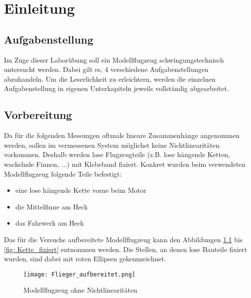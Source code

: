 \chapter{Einleitung}
\label{sec: Einleitung}

\section{Aufgabenstellung}
    Im Zuge dieser Laborübung soll ein Modellflugzeug schwingungstechnisch
    untersucht werden. Dabei gilt es, 4 verschiedene Aufgabenstellungen
    abzuhandeln. Um die Leserlichkeit zu erleichtern, werden die einzelnen
    Aufgabenstellung in eigenen Unterkapiteln jeweils vollständig abgearbeitet.

\section{Vorbereitung}
    Da für die folgenden Messungen oftmals lineare Zusammenhänge angenommen
    werden, sollen im vermessenen System möglichst keine Nichtlinearitäten
    vorkommen. Deshalb werden lose Flugzeugteile (z.B. lose hängende Ketten,
    wackelnde Finnen, ...) mit Klebeband fixiert.
    Konkret wurden beim verwendeten Modellflugzeug folgende Teile befestigt:

    \begin{itemize}
        \item eine lose hängende Kette vorne beim Motor
        \item die Mittelfinne am Heck
        \item das Fahrwerk am Heck
    \end{itemize}

    \noindent
    Das für die Versuche aufbereitete Modellflugzeug kann den Abbildungen
    \ref{fig: Modellflugzeug_vorbereitet} bis \ref{fig: Kette_fixiert} entnommen
    werden. Die Stellen, an denen lose Bauteile fixiert wurden, sind dabei mit
    roten Ellipsen gekennzeichnet.

    \begin{figure}[H]
        \centering
        \texttt{[image: Flieger\_aufbereitet.png]}
        \caption{Modellflugzeug ohne Nichtlinearitäten}
        \label{fig: Modellflugzeug_vorbereitet}
    \end{figure}

